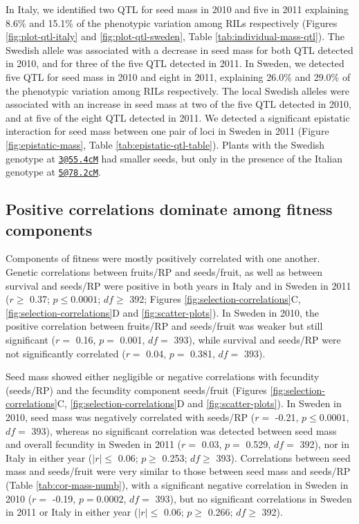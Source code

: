 \documentclass[]{article}
\begin{document}
In Italy, we identified two QTL for seed mass in 2010 and five in 2011 explaining 8.6\% and 15.1\% of the phenotypic variation among RILs respectively (Figures \ref{fig:plot-qtl-italy} and \ref{fig:plot-qtl-sweden}, Table \ref{tab:individual-mass-qtl}). The Swedish allele was associated with a decrease in seed mass for both QTL detected in 2010, and for three of the five QTL detected in 2011. In Sweden, we detected five QTL for seed mass in 2010 and eight in 2011, explaining 26.0\% and 29.0\% of the phenotypic variation among RILs respectively. The local Swedish alleles were associated with an increase in seed mass at two of the five QTL detected in 2010, and at five of the eight QTL detected in 2011. We detected a significant epistatic interaction for seed mass between one pair of loci in Sweden in 2011 (Figure \ref{fig:epistatic-mass}, Table \ref{tab:epistatic-qtl-table}). Plants with the Swedish genotype at \href{mailto:3@55.4cM}{\nolinkurl{3@55.4cM}} had smaller seeds, but only in the presence of the Italian genotype at \href{mailto:5@78.2cM}{\nolinkurl{5@78.2cM}}.

\hypertarget{positive-correlations-dominate-among-fitness-components}{%
\subsection{Positive correlations dominate among fitness components}\label{positive-correlations-dominate-among-fitness-components}}

Components of fitness were mostly positively correlated with one another. Genetic correlations between fruits/RP and seeds/fruit, as well as between survival and seeds/RP were positive in both years in Italy and in Sweden in 2011
(\(r \geq\)
0.37;
\(p \leq 0.0001\);
\(df \geq\)
392;
Figures \ref{fig:selection-correlations}C, \ref{fig:selection-correlations}D and \ref{fig:scatter-plots}).
In Sweden in 2010, the positive correlation between fruits/RP and seeds/fruit was weaker but still significant
(\(r=\) 0.16,
\(p=\) 0.001,
\(df=\) 393),
while survival and seeds/RP were not significantly correlated
(\(r=\) 0.04,
\(p=\) 0.381,
\(df=\) 393).

Seed mass showed either negligible or negative correlations with fecundity (seeds/RP) and the fecundity component seeds/fruit (Figures \ref{fig:selection-correlations}C, \ref{fig:selection-correlations}D and \ref{fig:scatter-plots}).
In Sweden in 2010, seed mass was negatively correlated with seeds/RP
(\(r=\) -0.21,
\(p \leq 0.0001\),
\(df=\) 393),
whereas no significant correlation was detected between seed mass and overall fecundity in Sweden in 2011
(\(r=\) 0.03,
\(p=\) 0.529,
\(df=\) 392),
nor in Italy in either year
(\(|r| \leq\) 0.06;
\(p \geq\) 0.253;
\(df \geq\)
393).
Correlations between seed mass and seeds/fruit were very similar to those between seed mass and seeds/RP (Table \ref{tab:cor-mass-numb}), with a significant negative correlation in Sweden in 2010
(\(r=\) -0.19,
\(p = 0.0002\),
\(df=\) 393),
but no significant correlations in Sweden in 2011 or Italy in either year
(\(|r| \leq\) 0.06;
\(p \geq\) 0.266;
\(df \geq\)
392).
\end{document}
